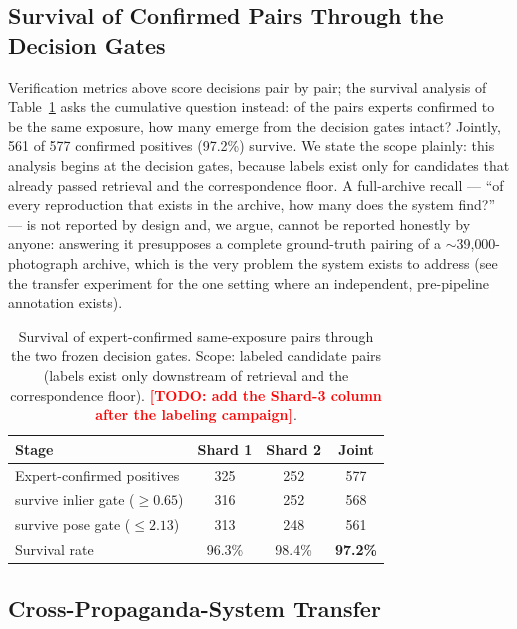 \documentclass[letterpaper]{article} %
\newcommand{\todo}[1]{\textcolor{red}{\textbf{[TODO: #1]}}}
\begin{document}
\subsection{Survival of Confirmed Pairs Through the Decision Gates}

Verification metrics above score decisions pair by pair; the survival
analysis of Table~\ref{tab:survival} asks the cumulative question instead:
of the pairs experts confirmed to be the same exposure, how many emerge
from the decision gates intact? Jointly, 561 of 577 confirmed positives
(97.2\%) survive. We state the scope plainly: this analysis begins at the
decision gates, because labels exist only for candidates that already
passed retrieval and the correspondence floor. A full-archive recall ---
``of every reproduction that exists in the archive, how many does the
system find?'' --- is not reported by design and, we argue, cannot be
reported honestly by anyone: answering it presupposes a complete
ground-truth pairing of a $\sim$39{,}000-photograph archive, which is the
very problem the system exists to address (see the transfer experiment
for the one setting where an independent, pre-pipeline annotation
exists).

\begin{table}[t]
\centering
\small
\begin{tabular}{@{}lccc@{}}
\toprule
Stage & Shard 1 & Shard 2 & Joint \\
\midrule
Expert-confirmed positives & 325 & 252 & 577 \\
survive inlier gate ($\geq 0.65$) & 316 & 252 & 568 \\
survive pose gate ($\leq 2.13$) & 313 & 248 & 561 \\
\midrule
Survival rate & 96.3\% & 98.4\% & \textbf{97.2\%} \\
\bottomrule
\end{tabular}
\caption{Survival of expert-confirmed same-exposure pairs through the two
frozen decision gates. Scope: labeled candidate pairs (labels exist only
downstream of retrieval and the correspondence floor). \todo{add the
Shard-3 column after the labeling campaign}.}
\label{tab:survival}
\end{table}

\subsection{Cross-Propaganda-System Transfer}
\end{document}
